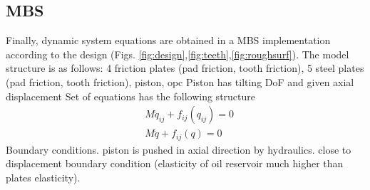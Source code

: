 \documentclass[a4paper,fleqn]{cas-dc}
\begin{document}
\subsection{MBS}
Finally, dynamic system equations are obtained in a MBS implementation according to the design (Figs. \ref{fig:design},\ref{fig:teeth},\ref{fig:roughsurf}). The model structure is as follows: 
4 friction plates (pad friction, tooth friction),
5 steel plates (pad friction, tooth friction), 
piston, 
opc
Piston has tilting DoF and given axial displacement 
Set of equations has the following structure 
\begin{align}
	&{M}\ddot{{q}}_{ij} + f_{ij}(q_{ij}) = 0\\
	&{M}\ddot{{q}} + f_{ij}(q) = 0
\end{align}
Boundary conditions. piston is pushed in axial direction by hydraulics. close to displacement boundary condition (elasticity of oil reservoir much higher than plates elasticity).
\end{document}
